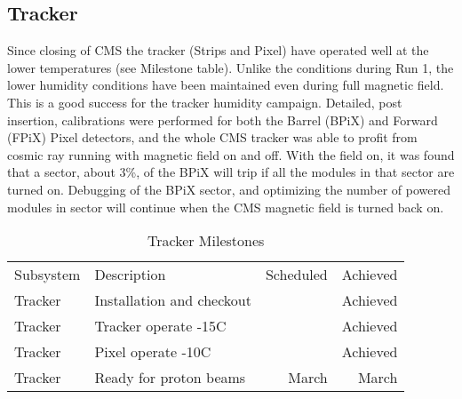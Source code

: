 \documentclass[12pt]{article}
\begin{document}
\subsection{Tracker}
Since closing of CMS the tracker (Strips and Pixel) have operated well at the lower temperatures (see
Milestone table). Unlike the conditions during Run 1, the lower humidity conditions have been maintained
even during full magnetic field. This is a good success for the tracker humidity campaign. Detailed, post insertion,
calibrations were performed for both the Barrel (BPiX) and Forward (FPiX) Pixel detectors, and the whole CMS
tracker was able to profit from cosmic ray running with magnetic field on and off. With the field
on, it was found that a sector, about 3\%, of the BPiX will trip if all the modules in that sector are turned on.
Debugging of the BPiX sector, and optimizing the number of powered modules in sector will continue when
the CMS magnetic field is turned back on.
\begin{table}[htdp]
\caption{Tracker Milestones}
\begin{center}
\begin{tabular}{|l|l|r|r|}
\hline
Subsystem&Description&Scheduled&Achieved\\

Tracker & Installation and checkout& & Achieved\\
\hline
Tracker & Tracker operate -15C & & Achieved\\
\hline
Tracker & Pixel operate -10C & & Achieved\\
\hline
Tracker& Ready for proton beams& March & March\\
\hline
\end{tabular}
\end{center}
\label{TrackerMilestones}
\end{table}%
\end{document}
